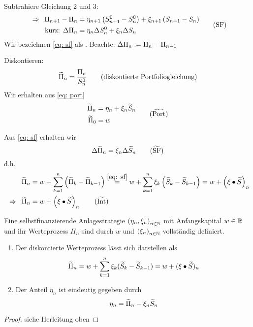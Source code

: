 Subtrahiere Gleichung 2 und 3: 
\begin{equation}
	\begin{aligned}
		\enskip \Rightarrow \enskip \Pi_{n+1} - \Pi_n &= \eta_{n+1} \left( S_{n+1}^0 - S_n^0 \right) + \xi_{n+1} \left( S_{n+1} - S_n \right) \\
		\text{kurz: } \Delta \Pi_n &= \eta_n \Delta S_n^0 + \xi_n \Delta S_n
	\end{aligned}
	\tag{SF} \label{eq: sf}
\end{equation}
Wir bezeichnen \eqref{eq: sf} als . Beachte: $\Delta \Pi_n \mathrel{:=} \Pi_n - \Pi_{n-1}$

Diskontieren:
\begin{equation}
	\widetilde{\Pi}_n = \frac{\Pi_n}{S_n^0} 
	\tag{diskontierte Portfoliogleichung}
\end{equation}
Wir erhalten aus \eqref{eq: port}
\begin{equation}
	\begin{aligned}
	\schlange{\Pi}_n &= \eta_n + \xi_n \schlange{S}_n \\
	\schlange{\Pi}_0 &= w
	\end{aligned}
	\tag{$\schlange{\text{Port}}$}
\end{equation}

Aus \eqref{eq: sf} erhalten wir
\begin{equation}
	\Delta \schlange{\Pi}_n = \xi_n \Delta \schlange{S}_n
	\tag{$\schlange{\text{SF}}$} \label{eq: sf-schlange}
\end{equation}
d.h.
\begin{align}
		\schlange{\Pi}_n  &= w + \sum_{k=1}^n \brackets{\schlange\Pi_k - \schlange\Pi_{k-1} }
		\overset{\eqref{eq: sf}}{=} w + \sum_{k=1}^n \xi_k \brackets{\schlange S_k - \schlange S_{k-1}} 
		= w + \brackets{\xi \bullet \schlange{S}}_n \nonumber \\
		\follows \schlange\Pi_n &= w + \brackets{\xi \bullet \schlange{S}}_n
		\tag{$\schlange{\text{Int}}$}
\end{align}


\begin{lemma} %
	Eine selbstfinanzierende Anlagestrategie $\left( \eta_n, \xi_n \right)_{n \in \mathbb{N}}$ mit Anfangskapital $w \in \mathbb{R}$ und ihr Werteprozess $\Pi_n$ sind durch $w$ und $\left( \xi_n \right)_{n \in \mathbb{N}}$ vollständig definiert. 
	\begin{enumerate}[label=(\alph*), leftmargin=*, nolistsep, topsep=-\parskip]
		\item Der diskontierte Werteprozess lässt sich darstellen als
		\begin{equation*}
		\widetilde{\Pi}_n = w + \sum_{k=1}^n \xi_k (\widetilde{S}_k - \widetilde{S}_{k-1}) = w + (\xi \bullet \widetilde{S})_n
		\end{equation*}
		\item Der Anteil $\eta_n$ ist eindeutig gegeben durch
		\begin{equation*}
		\eta_n = \widetilde{\Pi}_n - \xi_n \widetilde{S}_n
		\end{equation*}
	\end{enumerate}
\end{lemma}
\begin{proof}
	siehe Herleitung oben
\end{proof}
